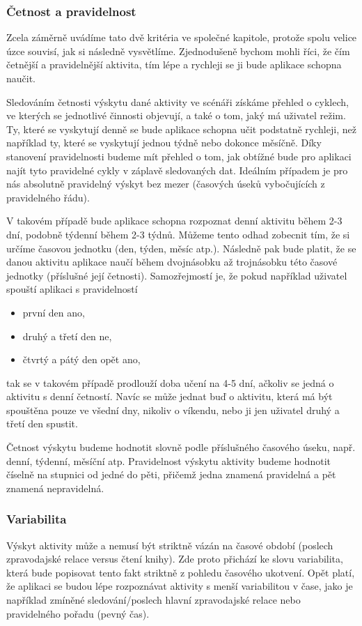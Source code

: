 \documentclass[thesis=M,czech]{FITthesis}[2012/06/26]
\begin{document}
\subsubsection*{Četnost a pravidelnost}
Zcela záměrně uvádíme tato dvě kritéria ve společné kapitole, protože spolu velice úzce souvisí, jak si následně vysvětlíme. Zjednodušeně bychom mohli říci, že čím četnější a pravidelnější aktivita, tím lépe a rychleji se ji bude aplikace schopna naučit.

Sledováním četnosti výskytu dané aktivity ve scénáři získáme přehled o cyklech, ve kterých se jednotlivé činnosti objevují, a také o tom, jaký má uživatel režim. Ty, které se vyskytují denně se bude aplikace schopna učit podstatně rychleji, než například ty, které se vyskytují jednou týdně nebo dokonce měsíčně. Díky stanovení pravidelnosti budeme mít přehled o tom, jak obtížné bude pro aplikaci najít tyto pravidelné cykly v záplavě sledovaných dat. Ideálním případem je pro nás absolutně pravidelný výskyt bez mezer (časových úseků vybočujících z pravidelného řádu).

V takovém případě bude aplikace schopna rozpoznat denní aktivitu během 2-3 dní, podobně týdenní během 2-3 týdnů. Můžeme tento odhad zobecnit tím, že si určíme časovou jednotku (den, týden, měsíc atp.). Následně pak bude platit, že se danou aktivitu aplikace naučí během dvojnásobku až trojnásobku této časové jednotky (příslušné její četnosti). Samozřejmostí je, že pokud například uživatel spouští aplikaci s pravidelností

\begin{itemize}
\item první den ano,
\item druhý a třetí den ne,
\item čtvrtý a pátý den opět ano,
\end{itemize}

tak se v takovém případě prodlouží doba učení na 4-5 dní, ačkoliv se jedná o aktivitu s denní četností. Navíc se může jednat buď o aktivitu, která má být spouštěna pouze ve všední dny, nikoliv o víkendu, nebo ji jen uživatel  druhý a třetí den spustit.

Četnost výskytu budeme hodnotit slovně podle příslušného časového úseku, např. denní, týdenní, měsíční atp. Pravidelnost výskytu aktivity budeme hodnotit číselně na stupnici od jedné do pěti, přičemž jedna znamená pravidelná a pět znamená nepravidelná.

\subsubsection*{Variabilita}
Výskyt aktivity může a nemusí být striktně vázán na časové období (poslech zpravodajské relace versus čtení knihy). Zde proto přichází ke slovu variabilita, která bude popisovat tento fakt striktně z pohledu časového ukotvení. Opět platí, že aplikaci se budou lépe rozpoznávat aktivity s menší variabilitou v čase, jako je například zmíněné sledování/poslech hlavní zpravodajské relace nebo pravidelného pořadu (pevný čas).
\end{document}
